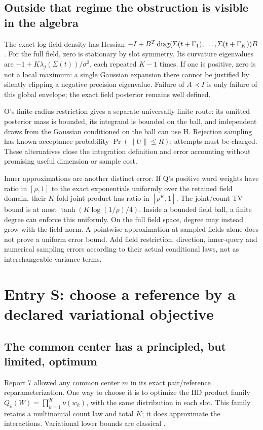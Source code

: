 \documentclass[10pt,a4paper]{article}
\begin{document}
\subsection{Outside that regime the obstruction is visible in the algebra}
The exact log field density has Hessian
$-I+B^T\operatorname{diag}(\Sigma(t+\Gamma_1),\ldots,\Sigma(t+\Gamma_K))B$.
For the full field, zero is stationary by slot symmetry. Its curvature eigenvalues are
$-1+K\lambda_j(\Sigma(t))/\sigma^2$, each repeated $K-1$ times.
If one is positive, zero is not a local maximum: a single Gaussian expansion there cannot be justified
by silently clipping a negative precision eigenvalue. Failure of $A\prec I$ is only failure of this
global envelope; the exact field posterior remains well defined.

O's finite-radius restriction gives a separate universally finite route: its omitted posterior mass is
bounded, its integrand is bounded on the ball, and independent draws from the Gaussian conditioned on
the ball can use H. Rejection sampling has known acceptance probability
$\Pr(\|U\|\leq R)$; attempts must be charged. These alternatives close the integration definition and
error accounting without promising useful dimension or sample cost.

Inner approximations are another distinct error. If Q's positive word weights have ratio in $[\rho,1]$
to the exact exponentials uniformly over the retained field domain, their $K$-fold joint product has
ratio in $[\rho^K,1]$. The joint/count TV bound is at most $\tanh(K\log(1/\rho)/4)$.
Inside a bounded field ball, a finite degree can enforce this uniformly. On the full field space, degree
may instead grow with the field norm. A pointwise approximation at sampled fields alone does not prove
a uniform error bound. Add field restriction, direction, inner-query and numerical sampling errors
according to their actual conditional laws, not as interchangeable variance terms.

\clearpage
\section{Entry S: choose a reference by a declared variational objective}
\label{sec:variational-reference}
\subsection{The common center has a principled, but limited, optimum}
Report 7 allowed any common center $m$ in its exact pair/reference reparameterization.
One way to choose it is to optimize the IID product family $Q_\nu(W)=\prod_{k=1}^K\nu(w_k)$, with the
same distribution in each slot. This family retains a multinomial count law and total $K$; it does
approximate the interactions. Variational lower bounds are classical \cite{wainwright-jordan}.
\end{document}
